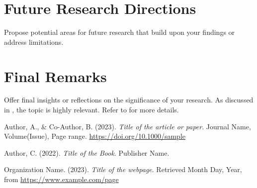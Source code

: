 \documentclass[12pt,a4paper]{report}
\begin{document}
\begin{spacing}{1.5}
    \section{Future Research Directions}
    Propose potential areas for future research that build upon your findings or address limitations.

    \section{Final Remarks}
    Offer final insights or reflections on the significance of your research.
    As discussed in \cite{Sample2023}, the topic is highly relevant. Refer to \cite{Book2022} for more details.


\end{spacing}
{}

% 
\renewcommand{\bibname}{References} %
\begin{thebibliography}{99}
    Author, A., \& Co-Author, B. (2023).
    \textit{Title of the article or paper}.
    Journal Name, Volume(Issue), Page range.
    \href{https://doi.org/10.1000/sample}{https://doi.org/10.1000/sample}

    Author, C. (2022).
    \textit{Title of the Book}.
    Publisher Name.

    Organization Name. (2023).
    \textit{Title of the webpage}.
    Retrieved Month Day, Year, from \url{https://www.example.com/page}
\end{thebibliography}

\appendix  %
\end{document}
